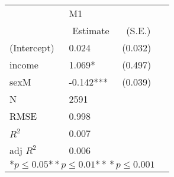 \begin{tabular}{@{}l*{3}{l}@{}}
\hline
  &\multicolumn{2}{l}{M1  }\tabularnewline
 &\multicolumn{1}{c}{Estimate}&\multicolumn{1}{c}{(S.E.)}\tabularnewline
 \hline
 \hline
  (Intercept) & 0.024 & (0.032) \tabularnewline
  income & 1.069* & (0.497) \tabularnewline
  sexM & -0.142*** & (0.039) \tabularnewline
 \hline
 N&\multicolumn{1}{l}{2591}  & \tabularnewline
 RMSE&0.998\tabularnewline
 $R^2$&0.007\tabularnewline
 adj $R^2$&0.006\tabularnewline
 \hline
\hline
 
 \multicolumn{3}{l}{  ${*  p}\le 0.05$${*\!\!*  p}\le 0.01$${*\!\!*\!\!*  p}\le 0.001$}\tabularnewline
 \end{tabular}